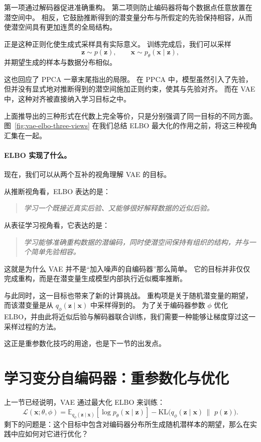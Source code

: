 第一项通过解码器促进准确重构。
第二项则防止编码器将每个数据点任意放置在潜空间中。
相反，它鼓励推断得到的潜变量分布与所假定的先验保持相容，从而使潜空间具有更加连贯的全局结构。

正是这种正则化使生成式采样具有实际意义。
训练完成后，我们可以采样
\[
\mathbf{z}\sim p(\mathbf{z}),
\qquad
\mathbf{x}\sim p_{\theta}(\mathbf{x}\mid \mathbf{z}),
\]
并期望生成的样本与数据分布相似。

这也回应了 PPCA 一章末尾指出的局限。
在 PPCA 中，模型虽然引入了先验，但并没有显式地对推断得到的潜空间施加正则约束，使其与先验对齐。
而在 VAE 中，这种对齐被直接纳入学习目标之中。

上面推导出的三种形式在代数上完全等价，只是分别强调了同一目标的不同方面。图~\ref{fig:vae-elbo-three-views}
在我们总结 ELBO 最大化的作用之前，将这三种视角汇集在一起。



\paragraph{ELBO 实现了什么。}

现在，我们可以从两个互补的视角理解 VAE 的目标。

从推断视角看，ELBO 表达的是：
\begin{quote}
\emph{学习一个既接近真实后验、又能够很好解释数据的近似后验。}
\end{quote}

从表征学习视角看，它表达的是：
\begin{quote}
\emph{学习能够准确重构数据的潜编码，同时使潜空间保持有组织的结构，并与一个简单先验相容。}
\end{quote}

这就是为什么 VAE 并不是“加入噪声的自编码器”那么简单。
它的目标并非仅仅完成重构，而是在潜变量生成模型内部执行近似概率推断。

与此同时，这一目标也带来了新的计算挑战。
重构项是关于随机潜变量的期望，而该潜变量是从
$q_{\phi}(\mathbf{z}\mid\mathbf{x})$ 中采样得到的。
为了关于编码器参数 $\phi$ 优化 ELBO，并由此将近似后验与解码器联合训练，我们需要一种能够让梯度穿过这一采样过程的方法。

这正是重参数化技巧的用途，也是下一节的出发点。

\section{学习变分自编码器：重参数化与优化}

上一节已经说明，VAE 通过最大化 ELBO 来训练：
\[
\mathcal{L}(\mathbf{x};\theta,\phi)
=
\mathbb{E}_{q_{\phi}(\mathbf{z}\mid\mathbf{x})}
\!\left[
\log p_{\theta}(\mathbf{x}\mid\mathbf{z})
\right]
-
\mathrm{KL}\!\bigl(
q_{\phi}(\mathbf{z}\mid\mathbf{x})
\,\|\,\,
p(\mathbf{z})
\bigr).
\]
剩下的问题是：这个目标中包含对编码器分布所生成随机潜样本的期望，那么在实践中应如何对它进行优化？

